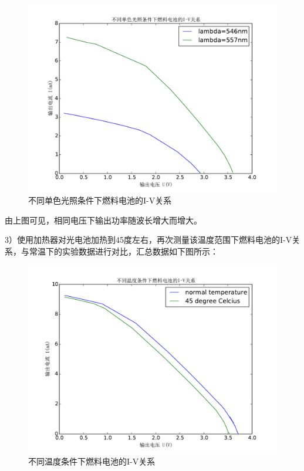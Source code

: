 ﻿\documentclass[10.5pt]{article}
\begin{document}
\begin{figure}[!ht]
\centering
\caption{不同单色光照条件下燃料电池的I-V关系}
\includegraphics[width=400pt]{DifferentWaveLengthSolarCellOutput.pdf}
\end{figure}
由上图可见，相同电压下输出功率随波长增大而增大。
\newline

3）使用加热器对光电池加热到45度左右，再次测量该温度范围下燃料电池的I-V关系，与常温下的实验数据进行对比，汇总数据如下图所示：
\begin{figure}[!ht]
\centering
\caption{不同温度条件下燃料电池的I-V关系}
\includegraphics[width=400pt]{DifferentTemperatureSolarCellOutput.pdf}
\end{figure}
\end{document}
